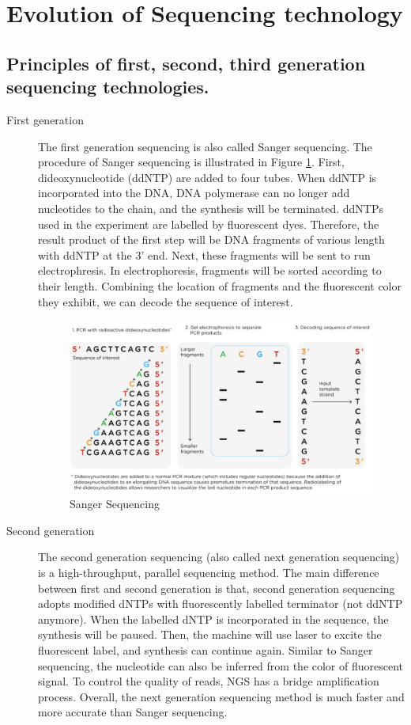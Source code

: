 \documentclass{article}
\begin{document}
\section{Evolution of Sequencing technology}

\subsection{Principles of first, second, third generation sequencing technologies.}
\begin{description}
    \item[First generation] The first generation sequencing is also called Sanger sequencing. The procedure of Sanger sequencing is illustrated in Figure \ref{sanger}. First, dideoxynucleotide (ddNTP) are added to four tubes.  When ddNTP is incorporated into the DNA, DNA polymerase can no longer add nucleotides to the chain, and the synthesis will be terminated. ddNTPs used in the experiment are labelled by fluorescent dyes. Therefore, the result product of the first step will be DNA fragments of various length with ddNTP at the 3' end. Next, these fragments will be sent to run electrophresis. In electrophoresis, fragments will be sorted according to their length. Combining the location of fragments and the fluorescent color they exhibit, we can decode the sequence of interest. 
    \begin{figure}[h]
        \centering
        \includegraphics[width=\textwidth]{A1-Image/Sanger.png}
        \caption{Sanger Sequencing}
        \label{sanger}
    \end{figure}
    \item[Second generation] The second generation sequencing (also called next generation sequencing) is a high-throughput, parallel sequencing method. The main difference between first and second generation is that, second generation sequencing adopts modified dNTPs with fluorescently labelled terminator (not ddNTP anymore). When the labelled dNTP is incorporated in the sequence, the synthesis will be paused. Then, the machine will use laser to excite the fluorescent label, and synthesis can continue again. Similar to Sanger sequencing, the nucleotide can also be inferred from the color of fluorescent signal. To control the quality of reads, NGS has a bridge amplification process. Overall, the next generation sequencing method is much faster and more accurate than Sanger sequencing.

\end{description}
\end{document}
